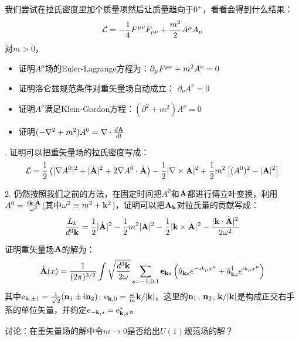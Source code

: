 \documentclass[CJK]{beamer}
\begin{document}
\begin{frame}
\bch
我们尝试在拉氏密度里加个质量项然后让质量趋向于$0^+$，看看会得到什么结果：
$${\mathcal{L}} = -\frac{1}{4}{F^{\mu\nu}}{F_{\mu\nu}} + \frac{m^2}{2} A^\mu A_\mu $$
对$m>0$，
\begin{itemize}
\item{证明$A^\mu$场的Euler-Lagrange方程为：$\partial_\mu {F^{\mu\nu}} + m^2 A^\nu = 0$}
\item{证明洛仑兹规范条件对重矢量场自动成立： $\partial_\nu A^\nu = 0$}
\item{证明$A^\nu$满足Klein-Gordon方程：$(\partial^2 + m^2) A^\nu = 0$}
\item{证明$(-\nabla^2+m^2)A^0 = \nabla \cdot \frac{d{\mathbf{A}}}{dt}$}
\end{itemize}

\ech
\end{frame}

\begin{frame}
. 证明可以把重矢量场的拉氏密度写成：
$${\mathcal{L}} = \frac{1}{2} \left( |\nabla A^0|^2  + |\dot{{\mathbf{A}}}|^2 + 2 \nabla A^0 \cdot \dot{{\mathbf{A}}} \right) - \frac{1}{2}|\nabla \times {\mathbf{A}}|^2 + \frac{1}{2}m^2 \left[(A^0)^2 - |{\mathbf{A}}|^2\right]$$ 

2. 仍然按照我们之前的方法，在固定时间把$A^0$和${\mathbf{A}}$都进行傅立叶变换，利用$A^0 = \frac{i{\mathbf{k}} \cdot\dot {{\mathbf{A}}}}{\omega^2}$(其中$\omega^2 \equiv m^2 + {\mathbf{k}}^2$)，证明可以把${\mathbf{A}}_{\mathbf{k}}$对拉氏量的贡献写成：
$$\frac{L_k}{d^3{\mathbf{k}}} = \frac{1}{2}|\dot{{\mathbf{A}}}|^2 - \frac{1}{2}m^2|{\mathbf{A}}|^2- \frac{1}{2}|{\mathbf{k}}\times{\mathbf{A}}|^2 - \frac{|{\mathbf{k}}\cdot\dot{{\mathbf{A}}}|^2}{2\omega^2}$$

\ech
\end{frame}

\begin{frame}
\bch
证明重矢量场${\mathbf{A}}$的解为：
$$\hat{{\mathbf{A}}}(x) = \frac{1}{(2\pi)^{3/2}} \int \sqrt{\frac{d^3{\mathbf{k}}}{2\omega}} \sum_{s=-1,0,1}\mathbf{e}_{{\mathbf{k}} s}\left({\hat{a}}_{{\mathbf{k}} s} e^{-ik_\mu x^\mu} + {\hat{a}^\dagger}_{{\mathbf{k}} s}e^{ik_\mu x^\mu}\right) $$
其中$\mathrm{e}_{{\mathbf{k}},\pm 1} = \frac{1}{\sqrt{2}}({\mathbf{n}}_1 \pm {\dot{\imath}} {\mathbf{n}}_2)$; $\mathrm{e}_{{\mathbf{k}}, 0} = \frac{\omega}{m} {\mathbf{k}}/|{\mathbf{k}}|$。这里的${\mathbf{n}}_1$, ${\mathbf{n}}_2$, ${\mathbf{k}}/|{\mathbf{k}}|$是构成正交右手系的单位矢量，并约定$\mathrm{e}_{-{\mathbf{k}}, s} = \mathrm{e}_{{\mathbf{k}},s}^*$。 

\skipline

讨论：在重矢量场的解中令$m\rightarrow 0$是否给出$U(1)$规范场的解？
\ech
\end{frame}
\end{document}
